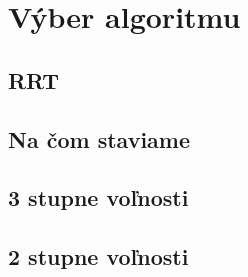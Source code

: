 \section{Výber algoritmu}
\label{kap:3}


\subsection{RRT}

\subsection{Na čom staviame}

\subsection{3 stupne voľnosti}

\subsection{2 stupne voľnosti}

